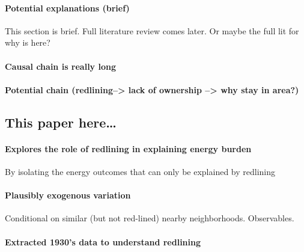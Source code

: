 \documentclass[
]{article}
\begin{document}
\hypertarget{potential-explanations-brief}{%
\paragraph{Potential explanations
(brief)}\label{potential-explanations-brief}}

This section is brief. Full literature review comes later. Or maybe the
full lit for why is here?

\hypertarget{causal-chain-is-really-long}{%
\paragraph{Causal chain is really
long}\label{causal-chain-is-really-long}}

\hypertarget{potential-chain-redlining-lack-of-ownership-why-stay-in-area}{%
\paragraph{Potential chain (redlining--\textgreater{} lack of ownership
--\textgreater{} why stay in
area?)}\label{potential-chain-redlining-lack-of-ownership-why-stay-in-area}}

\hypertarget{this-paper-here}{%
\subsection{This paper here\ldots{}}\label{this-paper-here}}

\hypertarget{explores-the-role-of-redlining-in-explaining-energy-burden}{%
\paragraph{Explores the role of redlining in explaining energy
burden}\label{explores-the-role-of-redlining-in-explaining-energy-burden}}

By isolating the energy outcomes that can only be explained by redlining

\hypertarget{plausibly-exogenous-variation}{%
\paragraph{Plausibly exogenous
variation}\label{plausibly-exogenous-variation}}

Conditional on similar (but not red-lined) nearby neighborhoods.
Observables.

\hypertarget{extracted-1930s-data-to-understand-redlining}{%
\paragraph{Extracted 1930's data to understand
redlining}\label{extracted-1930s-data-to-understand-redlining}}
\end{document}

